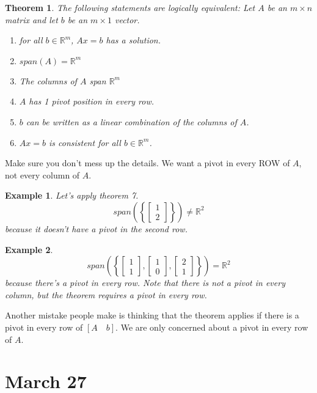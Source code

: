 \documentclass[11pt]{article}
\newtheorem{thm}{Theorem}
\newtheorem{ex}{Example}
\begin{document}
\begin{thm}
  The following statements are logically equivalent:
  Let $A$ be an $m \times n$ matrix and let $b$ be an $m \times 1$ vector.
  \begin{enumerate}
      \item for all $b \in \mathbb{R}^{m}$, $Ax = b$ has a solution.
      \item $span(A) = \mathbb{R}^{m}$
    \item The columns of $A$ span $\mathbb{R}^{m}$
      \item $A$ has 1 pivot position in every row.
      \item $b$ can be written as a linear combination of the columns of $A$.
      \item $Ax = b$ is consistent for all $b \in \mathbb{R}^{m}$.
  \end{enumerate}
\end{thm}

Make sure you don't mess up the details. We want a pivot in every ROW of $A$, not every column of $A$.
\begin{ex}
  Let's apply theorem 7.
  \[span\left(\left\{ \begin{bmatrix} 1 \\ 2 \end{bmatrix}\right\}\right) \neq \mathbb{R}^{2}\]
  because it doesn't have a pivot in the second row.
\end{ex}

\begin{ex}
  \[span\left(\left\{ \begin{bmatrix} 1 \\ 1 \end{bmatrix},\begin{bmatrix} 1 \\ 0 \end{bmatrix},\begin{bmatrix} 2 \\ 1 \end{bmatrix}\right\}\right) = \mathbb{R}^{2}\]
  because there's a pivot in every row.
  Note that there is not a pivot in every column, but the theorem requires a pivot in every row.
\end{ex}

Another mistake people make is thinking that the theorem applies if there is a pivot in every row of $\left [ A \quad b\right ]$. We are only concerned
about a pivot in every row of $A$.
\section{March 27}
\end{document}
